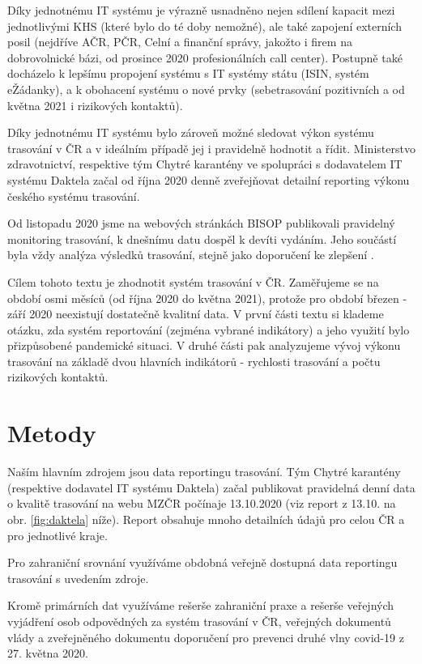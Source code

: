 Díky jednotnému IT systému je výrazně usnadněno nejen sdílení kapacit mezi jednotlivými KHS (které bylo do té doby nemožné), ale také zapojení externích posil (nejdříve AČR, PČR, Celní a finanční správy, jakožto i firem na dobrovolnické bázi, od prosince 2020 profesionálních call center). Postupně také docházelo k lepšímu propojení systému s IT systémy státu (ISIN, systém eŽádanky), a k obohacení systému o nové prvky (sebetrasování pozitivních a od května 2021 i rizikových kontaktů).

Díky jednotnému IT systému bylo zároveň možné sledovat výkon systému trasování v ČR a v ideálním případě jej i pravidelně hodnotit a řídit. Ministerstvo zdravotnictví, respektive tým Chytré karantény ve spolupráci s dodavatelem IT systému Daktela začal od října 2020 denně zveřejňovat detailní reporting výkonu českého systému trasování.

Od listopadu 2020 jsme na webových stránkách BISOP publikovali pravidelný monitoring trasování, k dnešnímu datu dospěl k devíti vydáním. Jeho součástí byla vždy analýza výsledků trasování, stejně jako doporučení ke zlepšení \cite{tr_bisop07}. 

Cílem tohoto textu je zhodnotit systém trasování v ČR. Zaměřujeme se na období osmi měsíců (od října 2020 do května 2021), protože pro období březen - září 2020 neexistují dostatečně kvalitní data. V první části textu si klademe otázku, zda systém reportování (zejména vybrané indikátory) a jeho využití bylo přizpůsobené pandemické situaci. V druhé části pak analyzujeme vývoj výkonu trasování na základě dvou hlavních indikátorů - rychlosti trasování a počtu rizikových kontaktů.

\section*{Metody}

Naším hlavním zdrojem jsou data reportingu trasování. Tým Chytré karantény (respektive dodavatel IT systému Daktela) začal publikovat pravidelná denní data o kvalitě trasování na webu MZČR počínaje 13.10.2020 (viz report z 13.10. na obr. \ref{fig:daktela} níže). Report obsahuje mnoho detailních údajů pro celou ČR a pro jednotlivé kraje.

Pro zahraniční srovnání využíváme obdobná veřejně dostupná data reportingu trasování s uvedením zdroje.

Kromě primárních dat využíváme rešerše zahraniční praxe a rešerše veřejných vyjádření osob odpovědných za systém trasování v ČR, veřejných dokumentů vlády a zveřejněného dokumentu doporučení pro prevenci druhé vlny covid-19 z 27. května 2020.

